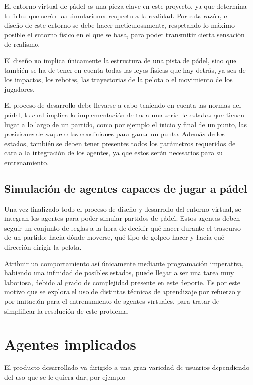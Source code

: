 El entorno virtual de pádel es una pieza clave en este proyecto, ya que determina lo fieles que serán las simulaciones respecto a la realidad. Por esta razón, el diseño de este entorno se debe hacer meticulosamente, respetando lo máximo posible el entorno físico en el que se basa, para poder transmitir cierta sensación de realismo.

El diseño no implica únicamente la estructura de una pista de pádel, sino que también se ha de tener en cuenta todas las leyes físicas que hay detrás, ya sea de los impactos, los rebotes, las trayectorias de la pelota o el movimiento de los jugadores.

El proceso de desarrollo debe llevarse a cabo teniendo en cuenta las normas del pádel, lo cual implica la implementación de toda una serie de estados que tienen lugar a lo largo de un partido, como por ejemplo el inicio y final de un punto, las posiciones de saque o las condiciones para ganar un punto. Además de los estados, también se deben tener presentes todos los parámetros requeridos de cara a la integración de los agentes, ya que estos serán necesarios para su entrenamiento.

\subsection{Simulación de agentes capaces de jugar a pádel}

Una vez finalizado todo el proceso de diseño y desarrollo del entorno virtual, se integran los agentes para poder simular partidos de pádel. Estos agentes deben seguir un conjunto de reglas a la hora de decidir qué hacer durante el trascurso de un partido: hacia dónde moverse, qué tipo de golpeo hacer y hacia qué dirección dirigir la pelota.

Atribuir un comportamiento así únicamente mediante programación imperativa, habiendo una infinidad de posibles estados, puede llegar a ser una tarea muy laboriosa, debido al grado de complejidad presente en este deporte. Es por este motivo que se explora el uso de distintas técnicas de aprendizaje por refuerzo y por imitación para el entrenamiento de agentes virtuales, para tratar de simplificar la resolución de este problema.

\newpage

\section{Agentes implicados}

El producto desarrollado va dirigido a una gran variedad de usuarios dependiendo del uso que se le quiera dar, por ejemplo:

